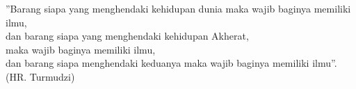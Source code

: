 \begin{dedication}

”Barang siapa yang menghendaki kehidupan dunia maka wajib baginya memiliki ilmu, \\
dan barang siapa yang menghendaki kehidupan Akherat, \\ 
maka wajib baginya memiliki ilmu, \\
dan barang siapa menghendaki keduanya maka wajib baginya memiliki ilmu”. \\
(HR. Turmudzi) \\

\end{dedication}